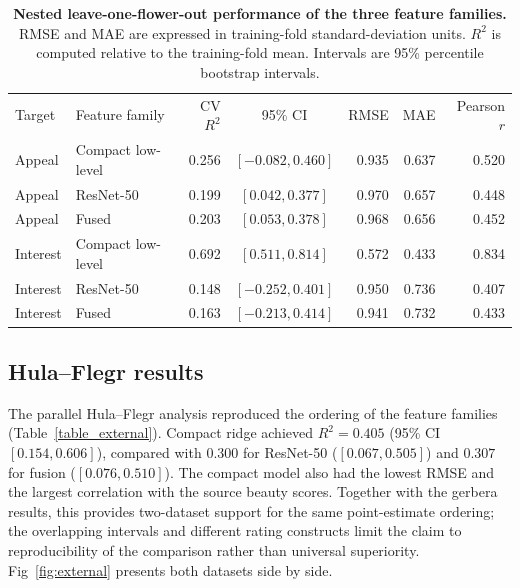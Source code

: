 \documentclass[10pt,letterpaper]{article}
\newlength\savedwidth
\newcommand\thickhline{\noalign{\global\savedwidth\arrayrulewidth\global\arrayrulewidth 2pt}\hline\noalign{\global\arrayrulewidth\savedwidth}}
\begin{document}
\begin{table}[!ht]
\centering
\caption{\textbf{Nested leave-one-flower-out performance of the three feature families.} RMSE and MAE are expressed in training-fold standard-deviation units. $R^2$ is computed relative to the training-fold mean. Intervals are 95\% percentile bootstrap intervals.}
\begin{tabular}{l l r c r r r}
\hline
Target & Feature family & CV $R^2$ & 95\% CI & RMSE & MAE & Pearson $r$\\ 
\thickhline
Appeal & Compact low-level & 0.256 & $[-0.082, 0.460]$  & 0.935 & 0.637 & 0.520\\
Appeal & ResNet-50 & 0.199 & $[0.042, 0.377]$ & 0.970 & 0.657 & 0.448\\
Appeal & Fused & 0.203 & $[0.053, 0.378]$ & 0.968 & 0.656 & 0.452\\
Interest & Compact low-level & 0.692 & $[0.511, 0.814]$ & 0.572 & 0.433 & 0.834\\
Interest & ResNet-50       & 0.148 & $[-0.252, 0.401]$ & 0.950 & 0.736 & 0.407\\
Interest & Fused           & 0.163 & $[-0.213, 0.414]$ & 0.941 & 0.732 & 0.433\\
\hline
\end{tabular}
\label{table_features}
\end{table}

    
   


\subsection*{Hula--Flegr results}
The parallel Hula--Flegr analysis reproduced the ordering of the feature families (Table~\ref{table_external}). Compact ridge achieved $R^2=0.405$ (95\% CI $[0.154, 0.606]$), compared with $0.300$ for ResNet-50 ($[0.067, 0.505]$) and $0.307$ for fusion ($[0.076, 0.510]$). The compact model also had the lowest RMSE and the largest correlation with the source beauty scores. Together with the gerbera results, this provides two-dataset support for the same point-estimate ordering; the overlapping intervals and different rating constructs limit the claim to reproducibility of the comparison rather than universal superiority. Fig~\ref{fig:external} presents both datasets side by side.
\end{document}
